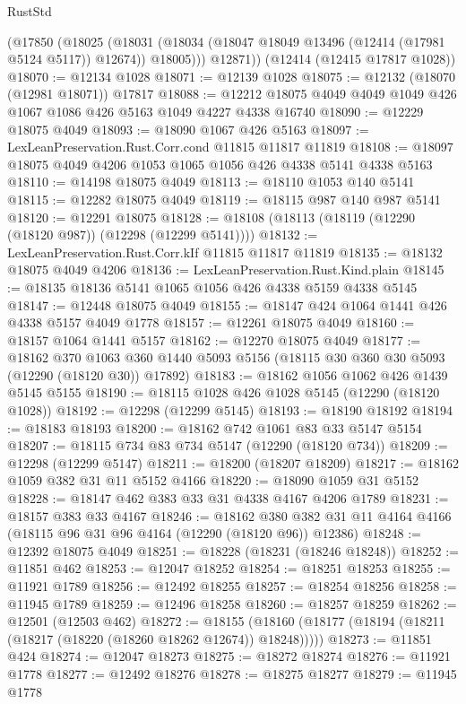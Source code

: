 \begin{lexlean}{RustStd}
\begin{coremodule}
        (@17850
          (@18025
            (@18031 (@18034 (@18047 @18049 @13496 (@12414 (@17981 @5124 @5117)) @12674)) @18005)))
        @12871))
    (@12414 (@12415 @17817 @1028))
@18070 := @12134 @1028
@18071 := @12139 @1028
@18075 := @12132 (@18070 (@12981 @18071)) @17817
@18088 := @12212 @18075 @4049 @4049 @1049 @426 @1067 @1086 @426 @5163 @1049 @4227 @4338 @16740
@18090 := @12229 @18075 @4049
@18093 := @18090 @1067 @426 @5163
@18097 := LexLeanPreservation.Rust.Corr.cond @11815 @11817 @11819
@18108 := @18097 @18075 @4049 @4206 @1053 @1065 @1056 @426 @4338 @5141 @4338 @5163
@18110 := @14198 @18075 @4049
@18113 := @18110 @1053 @140 @5141
@18115 := @12282 @18075 @4049
@18119 := @18115 @987 @140 @987 @5141
@18120 := @12291 @18075
@18128 := @18108 (@18113 (@18119 (@12290 (@18120 @987)) (@12298 (@12299 @5141))))
@18132 := LexLeanPreservation.Rust.Corr.kIf @11815 @11817 @11819
@18135 := @18132 @18075 @4049 @4206
@18136 := LexLeanPreservation.Rust.Kind.plain
@18145 := @18135 @18136 @5141 @1065 @1056 @426 @4338 @5159 @4338 @5145
@18147 := @12448 @18075 @4049
@18155 := @18147 @424 @1064 @1441 @426 @4338 @5157 @4049 @1778
@18157 := @12261 @18075 @4049
@18160 := @18157 @1064 @1441 @5157
@18162 := @12270 @18075 @4049
@18177 := @18162
    @370
    @1063
    @360
    @1440
    @5093
    @5156
    (@18115 @30 @360 @30 @5093 (@12290 (@18120 @30)) @17892)
@18183 := @18162 @1056 @1062 @426 @1439 @5145 @5155
@18190 := @18115 @1028 @426 @1028 @5145 (@12290 (@18120 @1028))
@18192 := @12298 (@12299 @5145)
@18193 := @18190 @18192
@18194 := @18183 @18193
@18200 := @18162 @742 @1061 @83 @33 @5147 @5154
@18207 := @18115 @734 @83 @734 @5147 (@12290 (@18120 @734))
@18209 := @12298 (@12299 @5147)
@18211 := @18200 (@18207 @18209)
@18217 := @18162 @1059 @382 @31 @11 @5152 @4166
@18220 := @18090 @1059 @31 @5152
@18228 := @18147 @462 @383 @33 @31 @4338 @4167 @4206 @1789
@18231 := @18157 @383 @33 @4167
@18246 := @18162
    @380
    @382
    @31
    @11
    @4164
    @4166
    (@18115 @96 @31 @96 @4164 (@12290 (@18120 @96)) @12386)
@18248 := @12392 @18075 @4049
@18251 := @18228 (@18231 (@18246 @18248))
@18252 := @11851 @462
@18253 := @12047 @18252
@18254 := @18251 @18253
@18255 := @11921 @1789
@18256 := @12492 @18255
@18257 := @18254 @18256
@18258 := @11945 @1789
@18259 := @12496 @18258
@18260 := @18257 @18259
@18262 := @12501 (@12503 @462)
@18272 := @18155 (@18160 (@18177 (@18194 (@18211 (@18217 (@18220 (@18260 @18262 @12674)) @18248)))))
@18273 := @11851 @424
@18274 := @12047 @18273
@18275 := @18272 @18274
@18276 := @11921 @1778
@18277 := @12492 @18276
@18278 := @18275 @18277
@18279 := @11945 @1778

\end{coremodule}
\end{lexlean}
